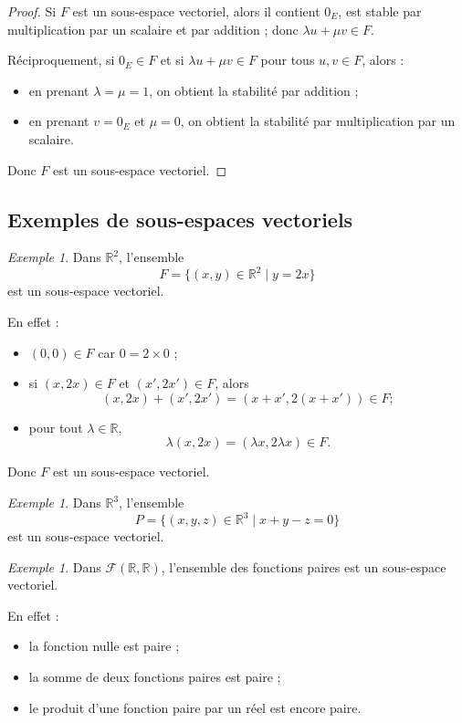 \documentclass[11pt,a4paper]{article}
\theoremstyle{remark}
\newtheorem{exemple}[definition]{Exemple}
\newcommand{\R}{\mathbb{R}}
\begin{document}
\begin{proof}
Si \(F\) est un sous-espace vectoriel, alors il contient \(0_E\), est stable par multiplication par un scalaire et par addition ; donc \(\lambda u+\mu v\in F\).

Réciproquement, si \(0_E\in F\) et si \(\lambda u+\mu v\in F\) pour tous \(u,v\in F\), alors :
\begin{itemize}
    \item en prenant \(\lambda=\mu=1\), on obtient la stabilité par addition ;
    \item en prenant \(v=0_E\) et \(\mu=0\), on obtient la stabilité par multiplication par un scalaire.
\end{itemize}
Donc \(F\) est un sous-espace vectoriel.
\end{proof}

\subsection{Exemples de sous-espaces vectoriels}

\begin{exemple}
Dans \(\R^2\), l’ensemble
\[
F=\{(x,y)\in\R^2\mid y=2x\}
\]
est un sous-espace vectoriel.

En effet :
\begin{itemize}
    \item \((0,0)\in F\) car \(0=2\times 0\) ;
    \item si \((x,2x)\in F\) et \((x',2x')\in F\), alors
    \[
    (x,2x)+(x',2x')=(x+x',2(x+x'))\in F ;
    \]
    \item pour tout \(\lambda\in\R\),
    \[
    \lambda(x,2x)=(\lambda x,2\lambda x)\in F.
    \]
\end{itemize}
Donc \(F\) est un sous-espace vectoriel.
\end{exemple}

\begin{exemple}
Dans \(\R^3\), l’ensemble
\[
P=\{(x,y,z)\in\R^3\mid x+y-z=0\}
\]
est un sous-espace vectoriel.
\end{exemple}

\begin{exemple}
Dans \(\mathcal{F}(\R,\R)\), l’ensemble des fonctions paires est un sous-espace vectoriel.

En effet :
\begin{itemize}
    \item la fonction nulle est paire ;
    \item la somme de deux fonctions paires est paire ;
    \item le produit d’une fonction paire par un réel est encore paire.
\end{itemize}
\end{exemple}
\end{document}
